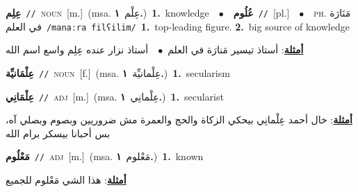 \documentclass[10pt,a4paper,twoside]{article} %
\begin{document}
\begin{multicols}{2}
{\setlength\topsep{0pt}\textbf{\foreignlanguage{arabic}{عِلِم}}\ {\color{gray}\texttt{//}\color{black}}\ \textsc{noun}\ [m.]\ \color{gray}(msa. \foreignlanguage{arabic}{عِلْم}~\foreignlanguage{arabic}{\textbf{١.}})\color{black}\ \textbf{1.}~knowledge\ \ $\bullet$\ \ \setlength\topsep{0pt}\textbf{\foreignlanguage{arabic}{عُلُوم}}\ {\color{gray}\texttt{//}\color{black}}\ [pl.]\ \ $\bullet$\ \ \textsc{ph.} \color{gray} \foreignlanguage{arabic}{مَنَارَة في العلم}\color{black}\ {\color{gray}\texttt{/{\sffamily manaːra filʕilim}/}\color{black}}\ \textbf{1.}~top-leading figure.  \textbf{2.}~big source of knowledge\  \begin{flushright}\color{gray}\foreignlanguage{arabic}{\textbf{\underline{\foreignlanguage{arabic}{أمثلة}}}: أستاذ تيسير مَنارَة في العلم\ $\bullet$\ \  أستاذ نزار عنده عِلِم واسع اسم الله}\end{flushright}\color{black}} \vspace{2mm}

{\setlength\topsep{0pt}\textbf{\foreignlanguage{arabic}{عِلْمَانيِّة}}\ {\color{gray}\texttt{//}\color{black}}\ \textsc{noun}\ [f.]\ \color{gray}(msa. \foreignlanguage{arabic}{عِلْمانيِّة}~\foreignlanguage{arabic}{\textbf{١.}})\color{black}\ \textbf{1.}~secularism\ } \vspace{2mm}

{\setlength\topsep{0pt}\textbf{\foreignlanguage{arabic}{عِلْمَانِي}}\ {\color{gray}\texttt{//}\color{black}}\ \textsc{adj}\ [m.]\ \color{gray}(msa. \foreignlanguage{arabic}{عِلْمانِي}~\foreignlanguage{arabic}{\textbf{١.}})\color{black}\ \textbf{1.}~secularist\  \begin{flushright}\color{gray}\foreignlanguage{arabic}{\textbf{\underline{\foreignlanguage{arabic}{أمثلة}}}: خال أحمد عِلْمانِي بيحكي الزكاة والحج والعمرة مش ضروريين وبصوم وبصلي آه، بس أحبانا بيسكر برام الله}\end{flushright}\color{black}} \vspace{2mm}

{\setlength\topsep{0pt}\textbf{\foreignlanguage{arabic}{مَعْلُوم}}\ {\color{gray}\texttt{//}\color{black}}\ \textsc{adj}\ [m.]\ \color{gray}(msa. \foreignlanguage{arabic}{مَعْلوم}~\foreignlanguage{arabic}{\textbf{١.}})\color{black}\ \textbf{1.}~known\  \begin{flushright}\color{gray}\foreignlanguage{arabic}{\textbf{\underline{\foreignlanguage{arabic}{أمثلة}}}: هذا الشي مَعْلوم للجميع}\end{flushright}\color{black}} \vspace{2mm}


\end{multicols}
\end{document}

